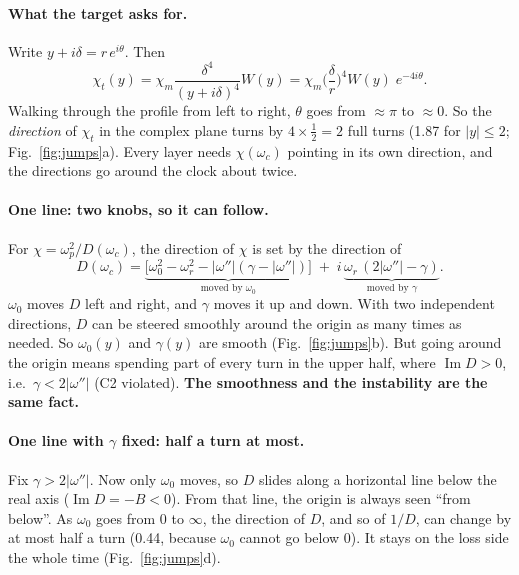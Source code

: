 \documentclass[11pt]{article}
\newcommand{\wi}{|\omega''|}          %
\renewcommand{\Im}{\operatorname{Im}}
\begin{document}
\paragraph{What the target asks for.} Write $y+i\delta = r\,e^{i\theta}$. Then
\begin{equation}
  \chi_t(y) = \chi_m\frac{\delta^4}{(y+i\delta)^4}W(y) = \chi_m\Big(\frac{\delta}{r}\Big)^4 W(y)\; e^{-4i\theta}.
\end{equation}
Walking through the profile from left to right, $\theta$ goes from $\approx\pi$ to $\approx0$.
So the \emph{direction} of $\chi_t$ in the complex plane turns by $4\times\tfrac12=2$ full turns (1.87 for $|y|\le2$; Fig.~\ref{fig:jumps}a).
Every layer needs $\chi(\omega_c)$ pointing in its own direction, and the directions go around the clock about twice.

\paragraph{One line: two knobs, so it can follow.} For $\chi=\omega_p^2/D(\omega_c)$, the direction of $\chi$ is set by the direction of
\begin{equation}
  D(\omega_c) = \underbrace{\big[\omega_0^2-\omega_r^2-\wi(\gamma-\wi)\big]}_{\text{moved by }\omega_0}
  \;+\; i\,\underbrace{\omega_r\,(2\wi-\gamma)}_{\text{moved by }\gamma} .
\end{equation}
$\omega_0$ moves $D$ left and right, and $\gamma$ moves it up and down. With two independent directions, $D$ can be steered smoothly around the origin as many times as needed. So $\omega_0(y)$ and $\gamma(y)$ are smooth (Fig.~\ref{fig:jumps}b).
But going around the origin means spending part of every turn in the upper half, where $\Im D>0$, i.e.\ $\gamma<2\wi$ (C2 violated).
\textbf{The smoothness and the instability are the same fact.}

\paragraph{One line with $\gamma$ fixed: half a turn at most.} Fix $\gamma>2\wi$. Now only $\omega_0$ moves, so $D$ slides along a horizontal line below the real axis ($\Im D = -B<0$).
From that line, the origin is always seen ``from below''. As $\omega_0$ goes from $0$ to $\infty$, the direction of $D$, and so of $1/D$, can change by at most half a turn (0.44, because $\omega_0$ cannot go below 0).
It stays on the loss side the whole time (Fig.~\ref{fig:jumps}d).
\end{document}
